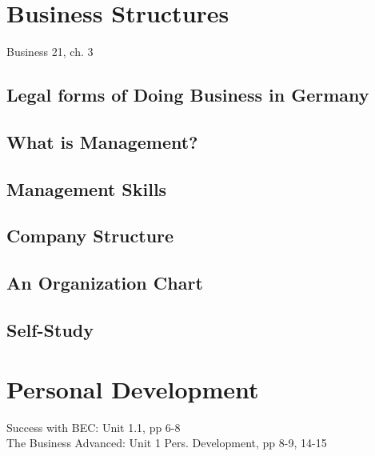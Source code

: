 \documentclass{scrreprt}
\begin{document}
\section{Business Structures}
Business 21, ch. 3
\subsection{Legal forms of Doing Business in Germany}



\subsection{What is Management?}
\subsection{Management Skills}
\subsection{Company Structure}
\subsection{An Organization Chart}
\subsection{Self-Study}


\section{Personal Development}
Success with BEC: Unit 1.1, pp 6-8\\
The Business Advanced: Unit 1 Pers. Development, pp 8-9, 14-15
\end{document}
